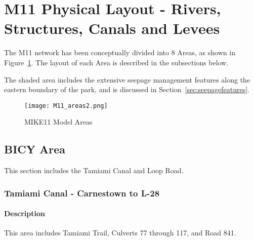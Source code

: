 \section{M11 Physical Layout - Rivers, Structures, Canals and Levees}


The M11 network has been conceptually divided into 8 Areas, as shown in Figure~\ref{fig:M11_areas}. The layout of each Area is described in the subsections below.

The shaded area includes the extensive seepage management features along the eastern boundary of the park, and is discussed in Section~\ref{sec:seepagefeatures}.

\begin{figure}[!h]
  \begin{center}
  \texttt{[image: M11\_areas2.png]}
  \caption[MIKE11 Model Areas]{MIKE11 Model Areas}
  \label{fig:M11_areas}
  \end{center}
\end{figure}

\clearpage

\subsection{BICY Area}
This section includes the Tamiami Canal and Loop Road.


\subsubsection{Tamiami Canal - Carnestown to L-28}

\paragraph{Description}
This area includes Tamiami Trail, Culverts 77 through 117, and Road 841.

